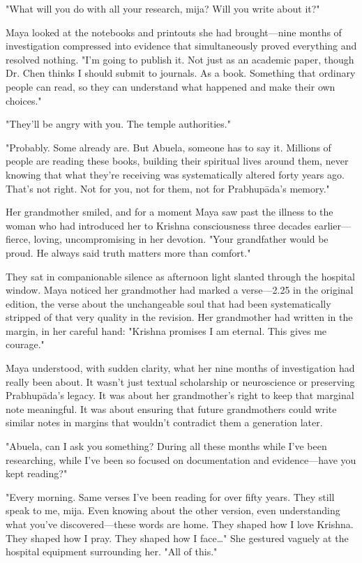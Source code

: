 \documentclass[12pt,twoside]{book}
\begin{document}
"What will you do with all your research, mija? Will you write about it?"

Maya looked at the notebooks and printouts she had brought—nine months of investigation compressed into evidence that simultaneously proved everything and resolved nothing. "I'm going to publish it. Not just as an academic paper, though Dr. Chen thinks I should submit to journals. As a book. Something that ordinary people can read, so they can understand what happened and make their own choices."

"They'll be angry with you. The temple authorities."

"Probably. Some already are. But Abuela, someone has to say it. Millions of people are reading these books, building their spiritual lives around them, never knowing that what they're receiving was systematically altered forty years ago. That's not right. Not for you, not for them, not for Prabhupāda's memory."

Her grandmother smiled, and for a moment Maya saw past the illness to the woman who had introduced her to Krishna consciousness three decades earlier—fierce, loving, uncompromising in her devotion. "Your grandfather would be proud. He always said truth matters more than comfort."

They sat in companionable silence as afternoon light slanted through the hospital window. Maya noticed her grandmother had marked a verse—2.25 in the original edition, the verse about the unchangeable soul that had been systematically stripped of that very quality in the revision. Her grandmother had written in the margin, in her careful hand: "Krishna promises I am eternal. This gives me courage."

Maya understood, with sudden clarity, what her nine months of investigation had really been about. It wasn't just textual scholarship or neuroscience or preserving Prabhupāda's legacy. It was about her grandmother's right to keep that marginal note meaningful. It was about ensuring that future grandmothers could write similar notes in margins that wouldn't contradict them a generation later.

"Abuela, can I ask you something? During all these months while I've been researching, while I've been so focused on documentation and evidence—have you kept reading?"

"Every morning. Same verses I've been reading for over fifty years. They still speak to me, mija. Even knowing about the other version, even understanding what you've discovered—these words are home. They shaped how I love Krishna. They shaped how I pray. They shaped how I face\ldots{}" She gestured vaguely at the hospital equipment surrounding her. "All of this."
\end{document}
